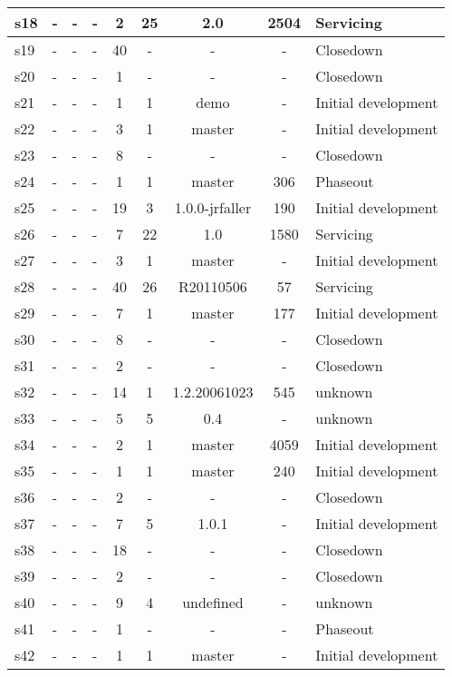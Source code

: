 \begin{longtable}{| l | l | l | l | c | c | c | c | l |}
    \hline
s18 & - & - & - & 2 & 25 & 2.0 & 2504 & Servicing \\
    \hline
s19 & - & - & - & 40 & - & - & - & Closedown \\
    \hline
s20 & - & - & - & 1 & - & - & - & Closedown \\
    \hline
s21 & - & - & - & 1 & 1 & demo & - & Initial development \\
    \hline
s22 & - & - & - & 3 & 1 & master & - & Initial development \\
    \hline
s23 & - & - & - & 8 & - & - & - & Closedown \\
    \hline
s24 & - & - & - & 1 & 1 & master & 306 & Phaseout \\
    \hline
s25 & - & - & - & 19 & 3 & 1.0.0-jrfaller & 190 & Initial development \\
    \hline
s26 & - & - & - & 7 & 22 & 1.0 & 1580 & Servicing \\
    \hline
s27 & - & - & - & 3 & 1 & master & - & Initial development \\
    \hline
s28 & - & - & - & 40 & 26 & R20110506 & 57 & Servicing \\
    \hline
s29 & - & - & - & 7 & 1 & master & 177 & Initial development \\
    \hline
s30 & - & - & - & 8 & - & - & - & Closedown \\
    \hline
s31 & - & - & - & 2 & - & - & - & Closedown \\
    \hline
s32 & - & - & - & 14 & 1 & 1.2.20061023 & 545 & unknown \\
    \hline
s33 & - & - & - & 5 & 5 & 0.4 & - & unknown \\
    \hline
s34 & - & - & - & 2 & 1 & master & 4059 & Initial development \\
    \hline
s35 & - & - & - & 1 & 1 & master & 240 & Initial development \\
    \hline
s36 & - & - & - & 2 & - & - & - & Closedown \\
    \hline
s37 & - & - & - & 7 & 5 & 1.0.1 & - & Initial development \\
    \hline
s38 & - & - & - & 18 & - & - & - & Closedown \\
    \hline
s39 & - & - & - & 2 & - & - & - & Closedown \\
    \hline
s40 & - & - & - & 9 & 4 & undefined & - & unknown \\
    \hline
s41 & - & - & - & 1 & - & - & - & Phaseout \\
    \hline
s42 & - & - & - & 1 & 1 & master & - & Initial development \\

\end{longtable}
